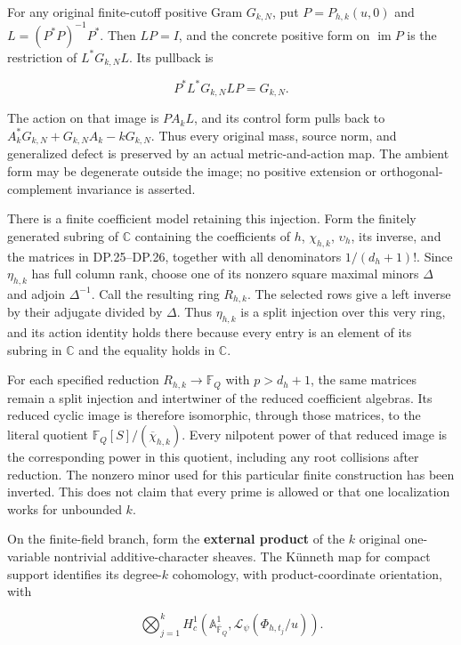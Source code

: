 For any original finite-cutoff positive Gram \(G_{k,N}\), put \(P=P_{h,k}(u,0)\) and \(L=(P^*P)^{-1}P^*\). Then \(LP=I\), and the concrete positive form on \(\operatorname{im}P\) is the restriction of \(L^*G_{k,N}L\). Its pullback is

\[
P^*L^*G_{k,N}LP=G_{k,N}.
\tag{DP.32}
\]

The action on that image is \(PA_kL\), and its control form pulls back to \(A_k^*G_{k,N}+G_{k,N}A_k-kG_{k,N}\). Thus every original mass, source norm, and generalized defect is preserved by an actual metric-and-action map. The ambient form may be degenerate outside the image; no positive extension or orthogonal-complement invariance is asserted.

There is a finite coefficient model retaining this injection. Form the finitely generated subring of \(\mathbb C\) containing the coefficients of \(h\), \(\chi_{h,k}\), \(\upsilon_h\), its inverse, and the matrices in DP.25--DP.26, together with all denominators \(1/(d_h+1)!\). Since \(\eta_{h,k}\) has full column rank, choose one of its nonzero square maximal minors \(\Delta\) and adjoin \(\Delta^{-1}\). Call the resulting ring \(R_{h,k}\). The selected rows give a left inverse by their adjugate divided by \(\Delta\). Thus \(\eta_{h,k}\) is a split injection over this very ring, and its action identity holds there because every entry is an element of its subring in \(\mathbb C\) and the equality holds in \(\mathbb C\).

For each specified reduction \(R_{h,k}\to\mathbb F_Q\) with \(p>d_h+1\), the same matrices remain a split injection and intertwiner of the reduced coefficient algebras. Its reduced cyclic image is therefore isomorphic, through those matrices, to the literal quotient \(\mathbb F_Q[S]/(\overline\chi_{h,k})\). Every nilpotent power of that reduced image is the corresponding power in this quotient, including any root collisions after reduction. The nonzero minor used for this particular finite construction has been inverted. This does not claim that every prime is allowed or that one localization works for unbounded \(k\).

On the finite-field branch, form the \textbf{external product} of the \(k\) original one-variable nontrivial additive-character sheaves. The Künneth map for compact support identifies its degree-\(k\) cohomology, with product-coordinate orientation, with

\[
\bigotimes_{j=1}^k
H_c^1(\mathbb A^1_{\overline{\mathbb F}_Q},
 \mathcal L_{\psi}(\Phi_{h,t_j}/u)).
\tag{DP.33}
\]

